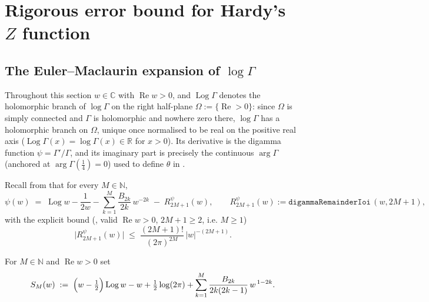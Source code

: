 
\chapter{Rigorous error bound for Hardy's $Z$ function}
\label{cha:hardy_z}

\section{The Euler--Maclaurin expansion of \texorpdfstring{$\log\Gamma$}{log Gamma}}
\label{sec:hz_loggamma}

Throughout this section $w\in\mathbb{C}$ with $\operatorname{Re}w>0$, and
$\operatorname{Log}\Gamma$ denotes the holomorphic branch of $\log\Gamma$ on the
right half-plane $\Omega:=\{\operatorname{Re}>0\}$: since $\Omega$ is simply connected
and $\Gamma$ is holomorphic and nowhere zero there, $\log\Gamma$ has a holomorphic
branch on $\Omega$, unique once normalised to be real on the positive real axis
($\operatorname{Log}\Gamma(x)=\log\Gamma(x)\in\mathbb{R}$ for $x>0$). Its derivative is
the digamma function $\psi=\Gamma'/\Gamma$, and its imaginary part is precisely the
continuous $\arg\Gamma$ (anchored at $\arg\Gamma(\tfrac14)=0$) used to define $\theta$
in .

Recall from  that for every $M\in\mathbb{N}$,
\begin{equation}
\tag{$\psi$}
\label{eq:hz_digamma}
  \psi(w) \;=\; \operatorname{Log}w-\frac1{2w}
    -\sum_{k=1}^{M}\frac{B_{2k}}{2k}\,w^{-2k}
    \;-\; R^{\psi}_{2M+1}(w),
  \qquad R^{\psi}_{2M+1}(w):=\texttt{digammaRemainderIoi}\,(w,2M+1),
\end{equation}
with the explicit bound (, valid $\operatorname{Re}w>0$,
$2M+1\ge2$, i.e. $M\ge1$)
\begin{equation}
\tag{$\psi$-bd}
\label{eq:hz_digamma_bound}
  \bigl|R^{\psi}_{2M+1}(w)\bigr|\;\le\;\frac{(2M+1)!}{(2\pi)^{2M}}\,\lvert w\rvert^{-(2M+1)}.
\end{equation}

\begin{definition}
\label{def:hz_stirling}
\leanok
{}
For $M\in\mathbb{N}$ and $\operatorname{Re}w>0$ set
\[
  S_M(w)\;:=\;\Bigl(w-\tfrac12\Bigr)\operatorname{Log}w-w+\tfrac12\log(2\pi)
    +\sum_{k=1}^{M}\frac{B_{2k}}{2k(2k-1)}\,w^{\,1-2k}.
\]
\end{definition}

